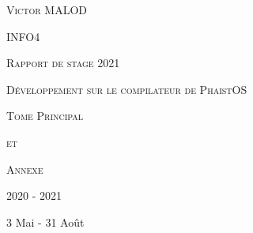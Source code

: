\begin{titlepage}
    \hfill
    \vfill
    
    \centering
    {\scshape \Large Victor MALOD \par}
    {\scshape \Large INFO4 \par}
    {\scshape \Large Rapport de stage 2021 \par}
    
    \vfill
    {\scshape \huge Développement sur le compilateur de PhaistOS \par}
    
    \vfill
    {\scshape\Large Tome Principal \par}
    {\scshape \Large et \par}
    {\scshape \Large Annexe \par}
    
    \vfill
    {\Large 2020 - 2021 \par}
    {\Large 3 Mai - 31 Août \par}
\end{titlepage}